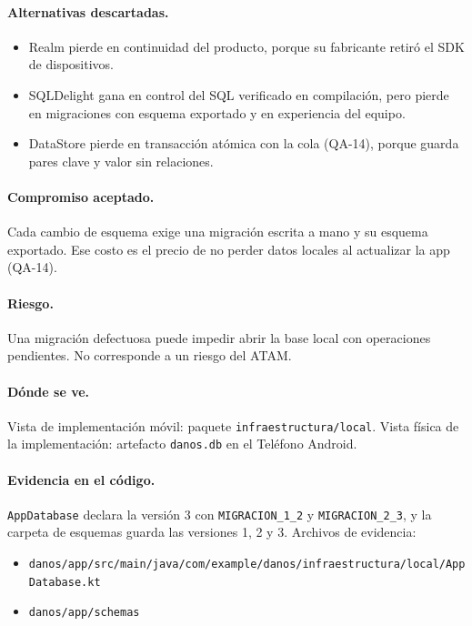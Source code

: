 \paragraph{Alternativas descartadas.}
\begin{itemize}
  \item Realm pierde en continuidad del producto, porque su fabricante retiró el SDK de dispositivos.
  \item SQLDelight gana en control del SQL verificado en compilación, pero pierde en migraciones con esquema exportado y en experiencia del equipo.
  \item DataStore pierde en transacción atómica con la cola (QA-14), porque guarda pares clave y valor sin relaciones.
\end{itemize}

\paragraph{Compromiso aceptado.} Cada cambio de esquema exige una migración escrita a mano y su esquema exportado.
Ese costo es el precio de no perder datos locales al actualizar la app (QA-14).

\paragraph{Riesgo.} Una migración defectuosa puede impedir abrir la base local con operaciones pendientes.
No corresponde a un riesgo del ATAM.

\paragraph{Dónde se ve.} Vista de implementación móvil: paquete \texttt{infraestructura/local}.
Vista física de la implementación: artefacto \texttt{danos.db} en el Teléfono Android.

\paragraph{Evidencia en el código.} \texttt{AppDatabase} declara la versión 3 con \texttt{MIGRACION\_1\_2} y \texttt{MIGRACION\_2\_3}, y la carpeta de esquemas guarda las versiones 1, 2 y 3.
Archivos de evidencia:
{\raggedright
\begin{itemize}
  \item \texttt{danos/\br{}app/\br{}src/\br{}main/\br{}java/\br{}com/\br{}example/\br{}danos/\br{}infraestructura/\br{}local/\br{}AppDatabase.kt}
  \item \texttt{danos/\br{}app/\br{}schemas}
\end{itemize}
\par}


